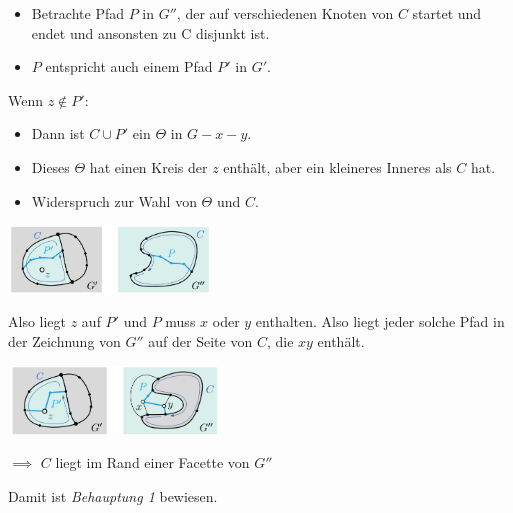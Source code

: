 \begin{itemize}
	\item Betrachte Pfad $P$ in $G''$, der auf verschiedenen Knoten von $C$ startet und endet und ansonsten zu C disjunkt ist.
	\item $P$ entspricht auch einem Pfad $P'$ in $G'$.
\end{itemize}

Wenn $z\notin P'$:
\begin{itemize}
	\item Dann ist $C\cup P'$ ein $\Theta$ in $G-x-y$.
	\item Dieses $\Theta$ hat einen Kreis der $z$ enthält, aber ein kleineres Inneres als $C$ hat.
	\item Widerspruch zur Wahl von $\Theta$ und $C$.
\end{itemize}
\begin{center}
	\includegraphics[width=0.4\textwidth]{images/wagner-5.png}
\end{center}

Also liegt $z$ auf $P'$ und $P$ muss $x$ oder $y$ enthalten. Also liegt jeder solche Pfad in der Zeichnung von $G''$ auf der Seite von $C$, die $xy$ enthält. 
\begin{center}
	\includegraphics[width=0.42\textwidth]{images/wagner-6.png}
\end{center}

$\implies$ $C$ liegt im Rand einer Facette von $G''$

Damit ist \textit{Behauptung 1} bewiesen.


